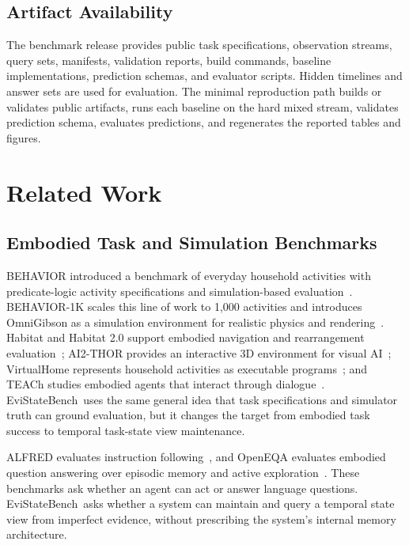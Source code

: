 \documentclass[conference]{IEEEtran}
\newcommand{\bench}{EviStateBench}
\begin{document}
\subsection{Artifact Availability}

The benchmark release provides public task specifications, observation streams, query sets, manifests, validation reports, build commands, baseline implementations, prediction schemas, and evaluator scripts. Hidden timelines and answer sets are used for evaluation. The minimal reproduction path builds or validates public artifacts, runs each baseline on the hard mixed stream, validates prediction schema, evaluates predictions, and regenerates the reported tables and figures.

\section{Related Work}
\label{sec:related}

\subsection{Embodied Task and Simulation Benchmarks}

BEHAVIOR introduced a benchmark of everyday household activities with predicate-logic activity specifications and simulation-based evaluation~\cite{srivastava2022behavior}. BEHAVIOR-1K scales this line of work to 1,000 activities and introduces OmniGibson as a simulation environment for realistic physics and rendering~\cite{li2024behavior1k}. Habitat and Habitat 2.0 support embodied navigation and rearrangement evaluation~\cite{savva2019habitat,szot2021habitat}; AI2-THOR provides an interactive 3D environment for visual AI~\cite{kolve2017ai2thor}; VirtualHome represents household activities as executable programs~\cite{puig2018virtualhome}; and TEACh studies embodied agents that interact through dialogue~\cite{padmakumar2022teach}. \bench\ uses the same general idea that task specifications and simulator truth can ground evaluation, but it changes the target from embodied task success to temporal task-state view maintenance.

ALFRED evaluates instruction following~\cite{shridhar2020alfred}, and OpenEQA evaluates embodied question answering over episodic memory and active exploration~\cite{majumdar2024openeqa}. These benchmarks ask whether an agent can act or answer language questions. \bench\ asks whether a system can maintain and query a temporal state view from imperfect evidence, without prescribing the system's internal memory architecture.
\end{document}
